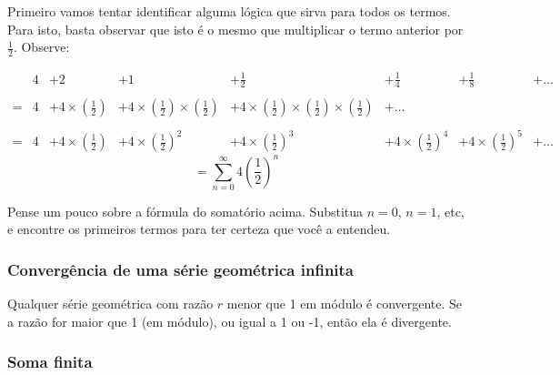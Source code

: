 \documentclass[a4paper]{article}
\begin{document}
Primeiro vamos tentar identificar alguma lógica que sirva para todos
os termos. Para isto, basta observar que isto é o mesmo que
multiplicar o termo anterior por $\frac{1}{2}$. Observe:


\begin{displaymath}
  \begin{array}{rccccccc}
    &4&+2&+1&+\frac{1}{2}&+\frac{1}{4}&+\frac{1}{8}&+\ldots\\
    &&&&&&&\\
    =&4& + 4\times\left(\frac{1}{2}\right)&+4\times\left(\frac{1}{2}\right)\times\left(\frac{1}{2}\right)&+4\times\left(\frac{1}{2}\right)\times\left(\frac{1}{2}\right)\times\left(\frac{1}{2}\right)& + \ldots& & \\
    &&&&&&&\\
    =&4& +4\times\left(\frac{1}{2}\right)&+4\times\left(\frac{1}{2}\right)^2&+4\times\left(\frac{1}{2}\right)^3&+4\times\left(\frac{1}{2}\right)^4&+4\times\left(\frac{1}{2}\right)^5&+\ldots
  \end{array}
\end{displaymath}
\begin{displaymath}
    = \sum_{n=0}^\infty 4\left(\frac{1}{2}\right)^n
\end{displaymath}

Pense um pouco sobre a fórmula do somatório acima. Substitua $n=0$,
$n=1$, etc, e encontre os primeiros termos para ter certeza que você a
entendeu.

\subsubsection{Convergência de uma série geométrica infinita}

Qualquer série geométrica com razão $r$ menor que 1 em módulo é
convergente. Se a razão for maior que 1 (em módulo), ou igual a 1 ou
-1, então ela é divergente.

\subsubsection{Soma finita}
\end{document}
